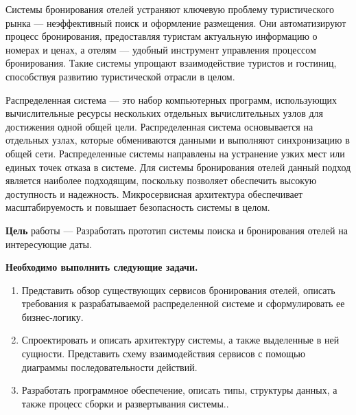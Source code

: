{}
Системы бронирования отелей устраняют ключевую проблему туристического рынка --- неэффективный поиск и оформление размещения. Они
автоматизируют процесс бронирования, предоставляя туристам актуальную информацию о номерах и ценах, а отелям --- удобный инструмент управления
процессом бронирования. Такие системы упрощают взаимодействие туристов и гостиниц, способствуя развитию туристической отрасли в целом.

Распределенная система --- это набор компьютерных программ, использующих вычислительные ресурсы нескольких отдельных вычислительных узлов для достижения одной общей цели. Распределенная система основывается на отдельных узлах, которые обмениваются данными и выполняют синхронизацию в общей сети. Распределенные системы направлены на устранение узких мест или единых точек отказа в системе. Для системы бронирования отелей данный подход является наиболее подходящим, поскольку позволяет обеспечить высокую доступность и надежность. Микросервисная архитектура обеспечивает масштабируемость и повышает безопасность системы в целом.

\textbf{Цель} работы --- Разработать прототип системы поиска и бронирования отелей на интересующие даты.

\textbf{Необходимо выполнить следующие задачи.}
\begin{enumerate}[topsep=0pt]
	\item Представить обзор существующих сервисов бронирования отелей, описать требования к разрабатываемой распределенной системе и сформулировать ее бизнес-логику.
	\item Спроектировать и описать архитектуру системы, а также выделенные в ней сущности. Представить схему взаимодействия сервисов с помощью диаграммы последовательности действий.
	\item Разработать программное обеспечение, описать типы, структуры данных, а также процесс сборки и развертывания системы..
\end{enumerate}